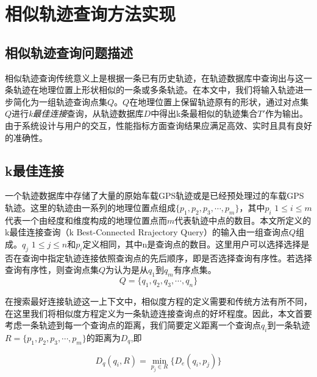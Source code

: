 
\theoremstyle{definition}
\newtheorem{definition}{定义}[section]

\chapter{相似轨迹查询方法实现}
\label{chap:implementation}

\section{相似轨迹查询问题描述}
\label{sec:question describe}
相似轨迹查询传统意义上是根据一条已有历史轨迹，在轨迹数据库中查询出与这一条轨迹在地理位置上形状相似的一条或多条轨迹。在本文中，我们将输入轨迹进一步简化为一组轨迹查询点集$Q$。$Q$在地理位置上保留轨迹原有的形状，通过对点集$Q$进行\emph{k最佳连接}查询，从轨迹数据库$D$中得出k条最相似的轨迹集合$T'$作为输出。由于系统设计与用户的交互，性能指标方面查询结果应满足高效、实时且具有良好的准确性。

\section{k最佳连接}
\label{sec:k-bct}
一个轨迹数据库中存储了大量的原始车载GPS轨迹或是已经预处理过的车载GPS轨迹。这里的轨迹由一系列的地理位置点组成$\{p_{1},p_{2},p_{3},\cdots, p_{m}\}$，其中$p_{i}$ $1\leq i \leq m$代表一个由经度和维度构成的地理位置点而$m$代表轨迹中点的数目。本文所定义的k最佳连接查询（k Best-Connected Rrajectory Query）的输入由一组查询点$Q$组成。$q_{j}$ $1 \leq j \leq n$和$p_{i}$定义相同，其中n是查询点的数目。这里用户可以选择选择是否在查询中指定轨迹连接依照查询点的先后顺序，即是否选择查询有序性。若选择查询有序性，则查询点集$Q$为认为是从$q_{1}$到$q_{m}$有序点集。
\begin{displaymath}
	Q = \{q_{1},q_{2},q_{3},\cdots, q_{n}\}
\end{displaymath}

在搜索最好连接轨迹这一上下文中，相似度方程的定义需要和传统方法有所不同，在这里我们将相似度方程定义为一条轨迹连接查询点的好坏程度。因此，本文首要考虑一条轨迹到每一个查询点的距离，我们简要定义距离一个查询点$q_{i}$到一条轨迹$R=\{p_{1},p_{2},p_{3},\cdots, p_{m}\}$的距离为$D_{q}$,即

\begin{equation}
	\label{eq3-1}
	D_{q}(q_{i}, R) = \min_{p_{j} \in R} \{D_{e}(q_{i}, p_{j})\} 
\end{equation}

